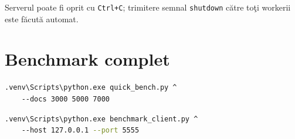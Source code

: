 \documentclass[a4paper,12pt]{report}
\begin{document}
\noindent Serverul poate fi oprit cu \texttt{Ctrl+C}; trimitere semnal \texttt{shutdown} c\u{a}tre to\c{t}i workerii este f\u{a}cut\u{a} automat.

\section*{Benchmark complet}
\begin{lstlisting}[language=bash, caption={Benchmark speedup local}]
.venv\Scripts\python.exe quick_bench.py ^
    --docs 3000 5000 7000
\end{lstlisting}

\begin{lstlisting}[language=bash, caption={Benchmark laten\c{t}\u{a} server (necesit\u{a} serverul pornit)}]
.venv\Scripts\python.exe benchmark_client.py ^
    --host 127.0.0.1 --port 5555
\end{lstlisting}
\end{document}
